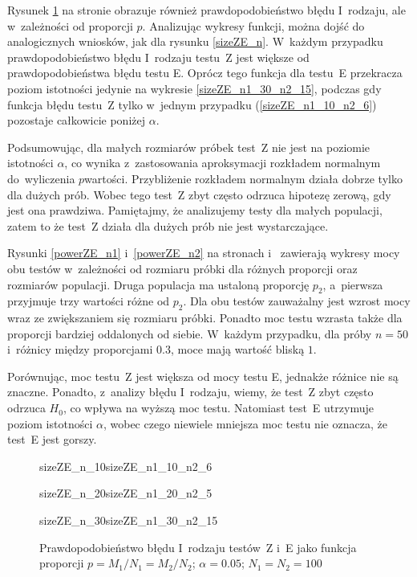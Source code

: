 Rysunek \ref{sizeZE_p} na stronie \pageref{sizeZE_p} obrazuje również prawdopodobieństwo błędu I~rodzaju, ale w~zależności od proporcji $p$. Analizując wykresy funkcji, można dojść do analogicznych wniosków, jak dla rysunku \ref{sizeZE_n}. W~każdym przypadku prawdopodobieństwo błędu I~rodzaju testu~Z jest większe od prawdopodobieństwa błędu testu E. Oprócz tego funkcja dla testu~E przekracza poziom istotności jedynie na wykresie \ref{sizeZE_n1_30_n2_15}, podczas gdy funkcja błędu testu~Z tylko w~jednym przypadku (\ref{sizeZE_n1_10_n2_6}) pozostaje całkowicie poniżej $\alpha$.

Podsumowując, dla małych rozmiarów próbek test~Z nie jest na poziomie istotności $\alpha$, co wynika z~zastosowania aproksymacji rozkładem normalnym do~wyliczenia $p$\dywiz wartości. Przybliżenie rozkładem normalnym działa dobrze tylko dla dużych prób. Wobec tego test~Z zbyt często odrzuca hipotezę zerową, gdy jest ona prawdziwa.
Pamiętajmy, że analizujemy testy dla małych populacji, zatem to że test~Z działa dla dużych prób nie jest wystarczające.

Rysunki \ref{powerZE_n1} i~\ref{powerZE_n2} na stronach \pageref{powerZE_n1} i~\pageref{powerZE_n2} zawierają wykresy mocy obu testów w~zależności od rozmiaru próbki dla różnych proporcji oraz rozmiarów populacji. Druga populacja ma ustaloną proporcję $p_2$, a~pierwsza przyjmuje trzy wartości różne od $p_2$. Dla obu testów zauważalny jest wzrost mocy wraz ze zwiększaniem się rozmiaru próbki. Ponadto moc testu wzrasta także dla proporcji bardziej oddalonych od siebie. W~każdym przypadku, dla próby $n=50$ i~różnicy między proporcjami $0.3$, moce mają wartość bliską $1$. 

Porównując, moc testu~Z jest większa od mocy testu E, jednakże różnice nie są znaczne. Ponadto, z~analizy błędu I~rodzaju, wiemy, że test~Z zbyt często odrzuca $H_0$, co wpływa na wyższą moc testu. Natomiast test~E utrzymuje poziom istotności $\alpha$, wobec czego niewiele mniejsza moc testu nie oznacza, że test~E jest gorszy. 

\begin{figure}[p]
	\begin{subdiagrams}{sizeZE_n_10}{sizeZE_n1_10_n2_6}
	\end{subdiagrams}
	
	\begin{subdiagrams}{sizeZE_n_20}{sizeZE_n1_20_n2_5}
	\end{subdiagrams}
	
	\begin{subdiagrams}{sizeZE_n_30}{sizeZE_n1_30_n2_15}
	\end{subdiagrams}
	\caption{Prawdopodobieństwo błędu I~rodzaju testów~Z i~E jako funkcja proporcji $p=M_1/N_1=M_2/N_2$; $\alpha=0.05$; $N_1=N_2=100$}
	\label{sizeZE_p}
\end{figure}


